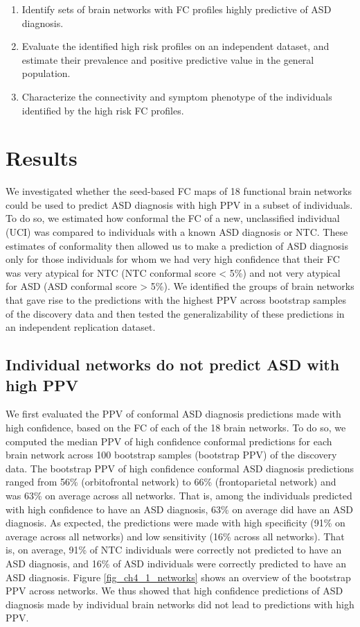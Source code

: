 \documentclass[9pt,lineno]{elife}
\begin{document}
\begin{enumerate}
    \item Identify sets of brain networks with FC profiles highly predictive of ASD diagnosis.
    \item Evaluate the identified high risk profiles on an independent dataset, and estimate their prevalence and positive predictive value in the general population.
    \item Characterize the connectivity and symptom phenotype of the individuals identified by the high risk FC profiles.
\end{enumerate}

\section{Results}
We investigated whether the seed-based FC maps of 18 functional brain networks could be used to predict ASD diagnosis with high PPV in a subset of individuals. To do so, we estimated how conformal the FC of a new, unclassified individual (UCI) was compared to individuals with a known ASD diagnosis or NTC. These estimates of conformality then allowed us to make a prediction of ASD diagnosis only for those individuals for whom we had very high confidence that their FC was very atypical for NTC (NTC conformal score < 5\%) and not very atypical for ASD (ASD conformal score > 5\%). We identified the groups of brain networks that gave rise to the predictions with the highest PPV across bootstrap samples of the discovery data and then tested the generalizability of these predictions in an independent replication dataset.

\subsection{Individual networks do not predict ASD with high PPV}
We first evaluated the PPV of conformal ASD diagnosis predictions made with high confidence, based on the FC of each of the 18 brain networks. To do so, we computed the median PPV of high confidence conformal predictions for each brain network across 100 bootstrap samples (bootstrap PPV) of the discovery data. The bootstrap PPV of high confidence conformal ASD diagnosis predictions ranged from 56\% (orbitofrontal network) to 66\% (frontoparietal network) and was 63\% on average across all networks. That is, among the individuals predicted with high confidence to have an ASD diagnosis, 63\% on average did have an ASD diagnosis. As expected, the predictions were made with high specificity (91\% on average across all networks) and low sensitivity (16\% across all networks). That is, on average, 91\% of NTC individuals were correctly not predicted to have an ASD diagnosis, and 16\% of ASD individuals were correctly predicted to have an ASD diagnosis. Figure \ref{fig_ch4_1_networks} shows an overview of the bootstrap PPV across networks. We thus showed that high confidence predictions of ASD diagnosis made by individual brain networks did not lead to predictions with high PPV. 
\end{document}
